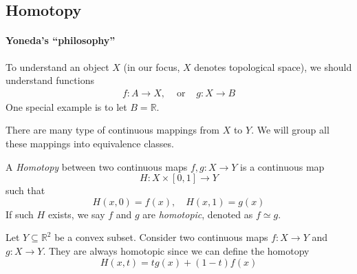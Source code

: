 \subsection{Homotopy}
\paragraph{Yoneda's ``philosophy''}
To understand an object $X$ (in our focus, $X$ denotes topological space), we should understand functions
\[
\begin{array}{lll}
f:A\to X,
&
\text{ or }
&
g:X\to B
\end{array}
\]
One special example is to let $B=\mathbb{R}$.

There are many type of continuous mappings from $X$ to $Y$. We will group all these mappings into equivalence classes.

\begin{definition}[Homotopy]
A \emph{Homotopy} between two continuous maps $f,g:X\to Y$ is a continuous map
\[
H:X\times[0,1]\to Y
\]
such that 
\[
H(x,0)=f(x),\quad
H(x,1)=g(x)
\]
If such $H$ exists, we say $f$ and $g$ are \emph{homotopic}, denoted as $f\simeq g$.
\end{definition}

\begin{example}\label{exp:8:7}
Let $Y\subseteq\mathbb{R}^2$ be a convex subset.
Consider two continuous maps $f:X\to Y$ and $g:X\to Y$.
They are always homotopic since we can define the homotopy
\[
H(x,t) = tg(x) + (1-t)f(x)
\]
\end{example}


